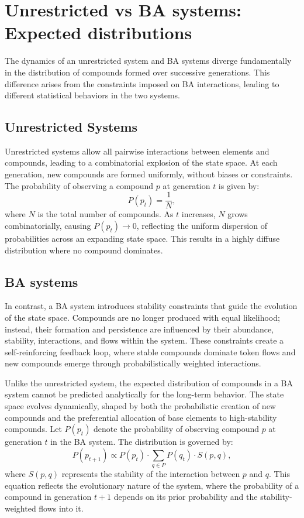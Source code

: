 \documentclass[entropy,article,submit,pdftex,oneauthor]{Definitions/mdpi}
\begin{document}
\section{Unrestricted vs BA systems: Expected distributions}

The dynamics of an unrestricted system and BA systems diverge fundamentally in the distribution of compounds formed over successive generations. This difference arises from the constraints imposed on BA interactions, leading to different statistical behaviors in the two systems.

\subsection{Unrestricted Systems}

Unrestricted systems allow all pairwise interactions between elements and compounds, leading to a combinatorial explosion of the state space. At each generation, new compounds are formed uniformly, without biases or constraints. The probability of observing a compound \( p \) at generation \( t \) is given by:
\begin{equation}
P(p_t) = \frac{1}{N},
\end{equation}
where \( N \) is the total number of compounds. As \( t \) increases, \( N \) grows combinatorially, causing \( P(p_t) \to 0 \), reflecting the uniform dispersion of probabilities across an expanding state space. This results in a highly diffuse distribution where no compound dominates.

\subsection{BA systems}

In contrast, a BA system introduces stability constraints that guide the evolution of the state space. Compounds are no longer produced with equal likelihood; instead, their formation and persistence are influenced by their abundance, stability, interactions, and flows within the system. These constraints create a self-reinforcing feedback loop, where stable compounds dominate token flows and new compounds emerge through probabilistically weighted interactions.

Unlike the unrestricted system, the expected distribution of compounds in a BA system cannot be predicted analytically for the long-term behavior. The state space evolves dynamically, shaped by both the probabilistic creation of new compounds and the preferential allocation of base elements to high-stability compounds. Let \( P(p_t) \) denote the probability of observing compound \( p \) at generation \( t \) in the BA system. The distribution is governed by:
\begin{equation}
P(p_{t+1}) \propto P(p_t) \cdot \sum_{q \in P} P(q_t) \cdot S(p, q),
\end{equation}
where \( S(p, q) \) represents the stability of the interaction between \( p \) and \( q \). This equation reflects the evolutionary nature of the system, where the probability of a compound in generation \( t+1 \) depends on its prior probability and the stability-weighted flows into it. 
\end{document}
